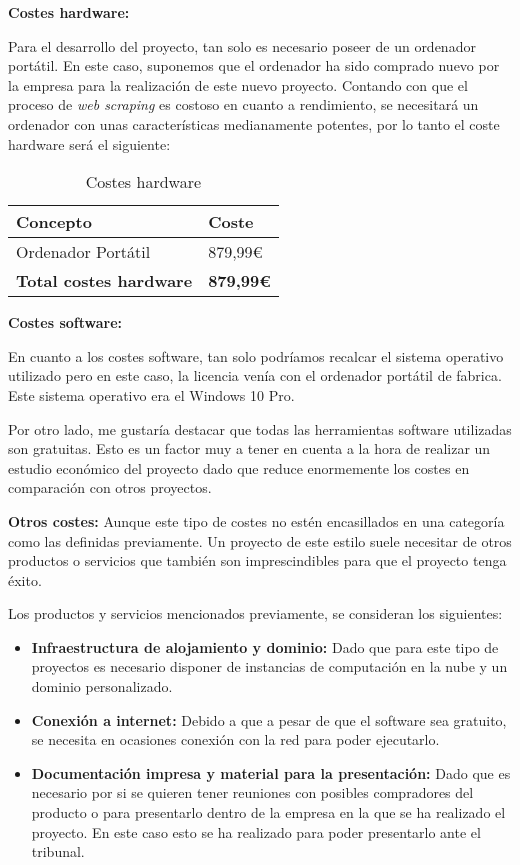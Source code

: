 \newpage

\textbf{Costes hardware:}

Para el desarrollo del proyecto, tan solo es necesario poseer de un ordenador portátil. En este caso, suponemos que el ordenador ha sido comprado nuevo por la empresa para la realización de este nuevo proyecto. Contando con que el proceso de \textit{web scraping} es costoso en cuanto a rendimiento, se necesitará un ordenador con unas características medianamente potentes, por lo tanto el coste hardware será el siguiente:

\begin{table}[H]
    \centering
    \renewcommand{\arraystretch}{1.2}
    \setlength{\tabcolsep}{20pt}
    \begin{tabular}{l l}
        \hline
        \textbf{Concepto} & \textbf{Coste} \\ \hline
        Ordenador Portátil & 879,99€ \\  \hline
        \textbf{Total costes hardware} & \textbf{879,99€}\\ \hline
    \end{tabular}
    \caption{Costes hardware}
    \label{tab:costes_hardware}
\end{table}

\textbf{Costes software:}

En cuanto a los costes software, tan solo podríamos recalcar el sistema operativo utilizado pero en este caso, la licencia venía con el ordenador portátil de fabrica. Este sistema operativo era el Windows 10 Pro.

Por otro lado, me gustaría destacar que todas las herramientas software utilizadas son gratuitas. Esto es un factor muy a tener en cuenta a la hora de realizar un estudio económico del proyecto dado que reduce enormemente los costes en comparación con otros proyectos.

\textbf{Otros costes:}
Aunque este tipo de costes no estén encasillados en una categoría como las definidas previamente. Un proyecto de este estilo suele necesitar de otros productos o servicios que también son imprescindibles para que el proyecto tenga éxito.  

Los productos y servicios mencionados previamente, se consideran los siguientes:

\begin{itemize}
\item \textbf{Infraestructura de alojamiento y dominio: } Dado que para este tipo de proyectos es necesario disponer de instancias de computación en la nube y un dominio personalizado.
\item \textbf{Conexión a internet: } Debido a que a pesar de que el software sea gratuito, se necesita en ocasiones conexión con la red para poder ejecutarlo.
\item \textbf{Documentación impresa y material para la presentación: } Dado que es necesario por si se quieren tener reuniones con posibles compradores del producto o para presentarlo dentro de la empresa en la que se ha realizado el proyecto. En este caso esto se ha realizado para poder presentarlo ante el tribunal.

\end{itemize}



